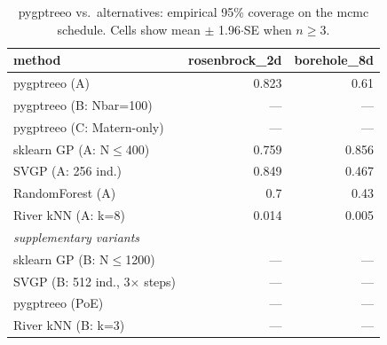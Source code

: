 \begin{table}[h]
\centering
\caption{pygptreeo vs.\ alternatives: empirical 95\% coverage on the mcmc schedule. Cells show mean $\pm$ 1.96$\cdot$SE when $n\geq 3$.}
\begin{tabular}{lrr}
\toprule
method & rosenbrock\_2d & borehole\_8d \\
\midrule
pygptreeo (A) & 0.823 & 0.61 \\
pygptreeo (B: Nbar=100) & --- & --- \\
pygptreeo (C: Matern-only) & --- & --- \\
sklearn GP (A: N$\leq$400) & 0.759 & 0.856 \\
SVGP (A: 256 ind.) & 0.849 & 0.467 \\
RandomForest (A) & 0.7 & 0.43 \\
River kNN (A: k=8) & 0.014 & 0.005 \\
\midrule
\multicolumn{3}{l}{\textit{supplementary variants}} \\
sklearn GP (B: N$\leq$1200) & --- & --- \\
SVGP (B: 512 ind., 3$\times$ steps) & --- & --- \\
pygptreeo (PoE) & --- & --- \\
River kNN (B: k=3) & --- & --- \\
\bottomrule
\end{tabular}
\end{table}
